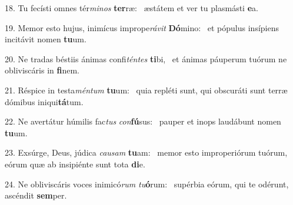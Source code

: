 18. Tu fecísti omnes tér\textit{mi}\textit{nos} \textbf{ter}ræ: \ast\  æstátem et ver tu plasmásti \textbf{e}a.\

19. Memor esto hujus, inimícus imprope\textit{rá}\textit{vit} \textbf{Dó}mino: \ast\  et pópulus insípiens incitávit nomen \textbf{tu}um.\

20. Ne tradas béstiis ánimas confi\textit{tén}\textit{tes} \textbf{ti}bi, \ast\  et ánimas páuperum tuórum ne obliviscáris in \textbf{fi}nem.\

21. Réspice in testa\textit{mén}\textit{tum} \textbf{tu}um: \ast\  quia repléti sunt, qui obscuráti sunt terræ dómibus iniqui\textbf{tá}tum.\

22. Ne avertátur húmilis fac\textit{tus} \textit{con}\textbf{fú}sus: \ast\  pauper et inops laudábunt nomen \textbf{tu}um.\

23. Exsúrge, Deus, júdica \textit{cau}\textit{sam} \textbf{tu}am: \ast\  memor esto improperiórum tuórum, eórum quæ ab insipiénte sunt tota \textbf{di}e.\

24. Ne obliviscáris voces inimicó\textit{rum} \textit{tu}\textbf{ó}rum: \ast\  supérbia eórum, qui te odérunt, ascéndit \textbf{sem}per.\

